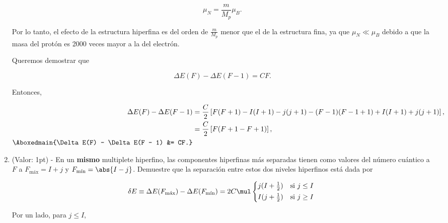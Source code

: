 \documentclass[./../main.tex]{subfiles}
\begin{document}
\begin{exercise}
\begin{enumerate}
\begin{solution}
                \begin{equation*}
                    \mu_{N} = \dfrac{m}{M_{p}}\mu_{B}.
                \end{equation*}

                Por lo tanto, el efecto de la estructura hiperfina es del orden de \(\tfrac{m}{M_{p}}\) menor que el de la estructura fina, ya que \(\mu_{N} \ll \mu_{B}\) debido a que la masa del protón es 2000 veces mayor a la del electrón.

                Queremos demostrar que

                \begin{equation*}
                    \Delta E (F) - \Delta E (F - 1) = CF.
                \end{equation*}

                Entonces,

                \begin{align*}
                    \Delta E(F) - \Delta E(F - 1) &= \dfrac{C}{2}\left[F(F + 1) - I(I + 1) - j(j + 1) - (F - 1)(F - 1 + 1) + I(I + 1) + j(j + 1)\right],\\
                    &= \dfrac{C}{2}\left[F(F + 1 - F + 1)\right],\\
                    \Aboxedmain{\Delta E(F) - \Delta E(F - 1) &= CF.}
                \end{align*}
            \end{solution}

            \item (Valor: 1pt) - En un \textbf{mismo} multiplete hiperfino, las componentes hiperfinas más separadas tienen como valores del número cuántico a \(F\) a \(F_{\text{máx}} = I + j\) y \(F_{\text{mín}} = \abs{I - j}\). Demuestre que la separación entre estos dos niveles hiperfinos está dada por
            
            \begin{equation*}
                \fdif{E} \equiv \adif{E}(F_{\text{máx}}) - \adif{E}(F_{\text{mín}}) = 2C \mul \begin{dcases*}
                    j(I + \tfrac{1}{2}) & si \(j \leq I\)\\
                    I(j + \tfrac{1}{2}) & si \(j \geq I\)
                \end{dcases*} 
            \end{equation*}

            \begin{solution}
                Por un lado, para \(j \leq I\),


\end{solution}
\end{enumerate}
\end{exercise}
\end{document}
